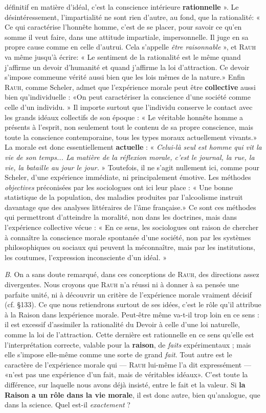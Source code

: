 définitif en matière d’idéal, c’est la conscience intérieure {\bf rationnelle} ».
Le désintéressement, l’impartialité ne sont rien d’autre, au fond, que
la rationalité: « Ce qui caractérise l’honnête homme, c’est de se placer,
pour savoir ce qu’en somme il veut faire, dans une attitude impartiale,
impersonnelle. Il juge en sa propre cause comme en celle d’autrui. Cela
s’appelle {\it être raisonnable} », et \textsc{Rauh} va même jusqu’à écrire: « Le sentiment
de la rationalité est le même quand j’affirme un devoir d’humanité
et quand j’affirme la loi d'attraction. Ce devoir s'impose commeune
vérité aussi bien que les lois mêmes de la nature.» Enfin \textsc{Rauh}, comme
Scheler, admet que l'expérience morale peut être {\bf collective} aussi bien
qu’individuelle : «On peut caractériser la conscience d’une société comme
celle d’un individu. » Il importe surtout que l’individu conserve le
contact avec les grands idéaux collectifs de son époque : « Le véritable
honnête homme a présents à l’esprit, non seulement tout le contenu
de sa propre conscience, mais toute la conscience contemporaine,
tous les types moraux actuellement vivants.» La morale est donc
essentiellement {\bf actuelle} : « {\it Celui-là seul est homme qui vit la vie de
son temps... La matière de la réflexion morale, c’est le journal, la rue,
la vie, la bataille au jour le jour.} » Toutefois, il ne s’agit nullement ici,
comme pour Scheler, d’une expérience immédiate, ni principalement
émotive. Les méthodes {\it objectives} préconisées par les sociologues ont
ici leur place : « Une bonne statistique de la population, des maladies
produites par l'alcoolisme instruit davantage que des analyses littéraires
de l’âme française.» Ce sont ces méthodes qui permettront
d'atteindre la moralité, non dans les doctrines, mais dans l'expérience
collective vécue : « En ce sens, les sociologues ont raison de chercher
à connaître la conscience morale spontanée d’une société, non par les
systèmes philosophiques ou sociaux qui peuvent la méconnaître,
mais par les institutions, les coutumes, l’expression inconsciente d’un
idéal. »

{\it B}. On a sans doute remarqué, dans ces conceptions de \textsc{Rauh}, des
directions assez divergentes. Nous croyons que \textsc{Rauh} n’a réussi ni
à donner à sa pensée une parfaite unité, ni à découvrir un critère de
l'expérience morale vraiment décisif (cf. \S 133). Ce que nous retiendrons
surtout de ses idées, c’est le rôle qu’il attribue à la Raison dans
lexpérience morale. Peut-être même va-t-il trop loin en ce sens : il est
excessif d’assimiler la rationalité du Devoir à celle d’une loi naturelle,
comme la loi de l'attraction. Cette dernière est rationnelle en ce sens
qu’elle est l’interprétation correcte, valable pour la {\bf raison}, de {\it faits}
expérimentaux ; mais elle s’impose elle-même comme une sorte de
grand {\it fait}. Tout autre est le caractère de l'expérience morale qui —
\textsc{Rauh} lui-même l’a dit expressément — «n’est pas une expérience d’un
fait, mais de véritables idéaux». C’est toute la différence, sur laquelle
nous avons déjà insisté, entre le fait et la valeur. Si {\bf la Raison a un rôle
dans la vie morale}, il est donc autre, bien qu’analogue, que dans la
science. Quel est-il {\it exactement} ?

